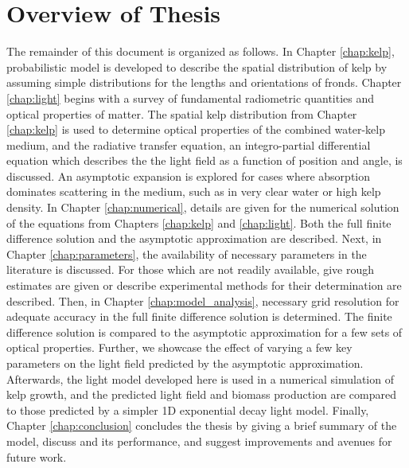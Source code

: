 \section{Overview of Thesis}
The remainder of this document is organized as follows.
In Chapter \ref{chap:kelp}, probabilistic model is developed to describe the spatial distribution of kelp by assuming simple distributions for the lengths and orientations of fronds.
Chapter \ref{chap:light} begins with a survey of fundamental radiometric quantities and optical properties of matter.
The spatial kelp distribution from Chapter \ref{chap:kelp} is used to determine optical properties of the combined water-kelp medium,
and the radiative transfer equation, an integro-partial differential equation which describes the the light field as a function of position and angle, is discussed.
An asymptotic expansion is explored for cases where absorption dominates scattering in the medium, such as in very clear water or high kelp density.
In Chapter \ref{chap:numerical}, details are given for the numerical solution of the equations from Chapters \ref{chap:kelp} and \ref{chap:light}.
Both the full finite difference solution and the asymptotic approximation are described.
Next, in Chapter \ref{chap:parameters}, the availability of necessary parameters in the literature is discussed.
For those which are not readily available, give rough estimates are given or describe experimental methods for their determination are described.
Then, in Chapter \ref{chap:model_analysis}, necessary grid resolution for adequate accuracy in the full finite difference solution is determined.
The finite difference solution is compared to the asymptotic approximation for a few sets of optical properties.
Further, we showcase the effect of varying a few key parameters on the light field predicted by the asymptotic approximation.
Afterwards, the light model developed here is used in a numerical simulation of kelp growth, and the predicted light field and biomass production are compared to those predicted by a simpler 1D exponential decay light model.
Finally, Chapter \ref{chap:conclusion} concludes the thesis by giving a brief summary of the model, discuss and its performance, and suggest improvements and avenues for future work.
